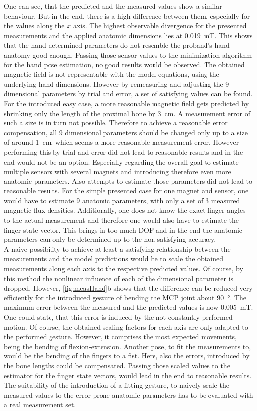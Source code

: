 One can see, that the predicted and the measured values show a similar behaviour. But in the end, there is a high difference between them, especially for the values along the $ x $ axis. The highest observable divergence for the presented measurements and the applied anatomic dimensions lies at \SI{0.019}{\milli \tesla}. This shows that the hand determined parameters do not resemble the proband's hand anatomy good enough. Passing those sensor values to the minimization algorithm for the hand pose estimation, no good results would be observed. The obtained magnetic field is not representable with the model equations, using the underlying hand dimensions. However by remeasuring and adjusting the 9 dimensional parameters by trial and error, a set of satisfying values can be found. For the introduced easy case, a more reasonable magnetic field gets predicted by shrinking only the length of the proximal bone by \SI{3}{\cm}. A measurement error of such a size is in turn not possible. Therefore to achieve a reasonable error compensation, all 9 dimensional parameters should be changed only up to a size of around \SI{1}{\cm}, which seems a more reasonable measurement error. However performing this by trial and error did not lead to reasonable results and in the end would not be an option. Especially regarding the overall goal to estimate multiple sensors with several magnets and introducing therefore even more anatomic parameters. Also attempts to estimate those parameters did not lead to reasonable results. For the simple presented case for one magnet and sensor, one would have to estimate 9 anatomic parameters, with only a set of 3 measured magnetic flux densities. Additionally, one does not know the exact finger angles to the actual measurement and therefore one would also have to estimate the finger state vector. This brings in too much \ac{DOF} and in the end the anatomic parameters can only be determined up to the non-satisfying accuracy.\\ 
A naive possibility to achieve at least a satisfying relationship between the measurements and the model predictions would be to scale the obtained measurements along each axis to the respective predicted values. Of course, by this method the nonlinear influence of each of the dimensional parameter is dropped. However, \ref{fig:measHand}b shows that the difference can be reduced very efficiently for the introduced gesture of bending the \ac{MCP} joint about \SI{90}{\degree}. The maximum error between the measured and the predicted values is now \SI{0.005}{\milli \tesla}. One could state, that this error is induced by the not constantly performed motion. Of course, the obtained scaling factors for each axis are only adapted to the performed gesture. However, it comprises the most expected movements, being the bending of flexion-extension. Another pose, to fit the measurements to, would be the bending of the fingers to a fist. Here, also the errors, introduced by the bone lengths could be compensated. Passing those scaled values to the estimator for the finger state vectors, would lead in the end to reasonable results. The suitability of the introduction of a fitting gesture, to naively scale the measured values to the error-prone anatomic parameters has to be evaluated with a real measurement set.


